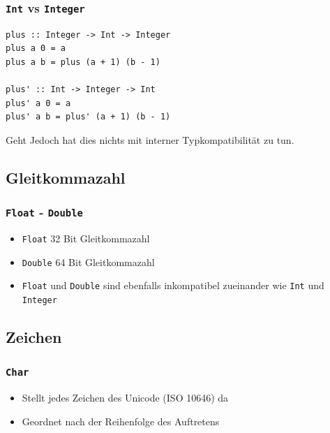 \begin{frame}[fragile]
\frametitle{\lstinline|Int| vs \lstinline|Integer|} 
\begin{lstlisting}
plus :: Integer -> Int -> Integer
plus a 0 = a
plus a b = plus (a + 1) (b - 1)

plus' :: Int -> Integer -> Int
plus' a 0 = a
plus' a b = plus' (a + 1) (b - 1)
\end{lstlisting}
\begin{alertblock}{Geht}
Jedoch hat dies nichts mit interner Typkompatibilität zu tun.
\end{alertblock}
\end{frame}

\subsection{Gleitkommazahl}
\begin{frame}
\frametitle{\lstinline|Float| - \lstinline|Double|}
\begin{block}{\vspace*{-3ex}}
\begin{itemize}
  \item \lstinline|Float| 32 Bit Gleitkommazahl 
  \item \lstinline|Double| 64 Bit Gleitkommazahl
  \item \lstinline|Float| und \lstinline|Double| sind ebenfalls inkompatibel zueinander wie \lstinline|Int| und \lstinline|Integer|
\end{itemize}
\end{block}
\end{frame}

\subsection{Zeichen}
\begin{frame}
\frametitle{\lstinline|Char|}
\begin{block}{\vspace*{-3ex}}
\begin{itemize}
  \item Stellt jedes Zeichen des Unicode (ISO 10646) da
  \item Geordnet nach der Reihenfolge des Auftretens
\end{itemize}
\end{block}
\end{frame}